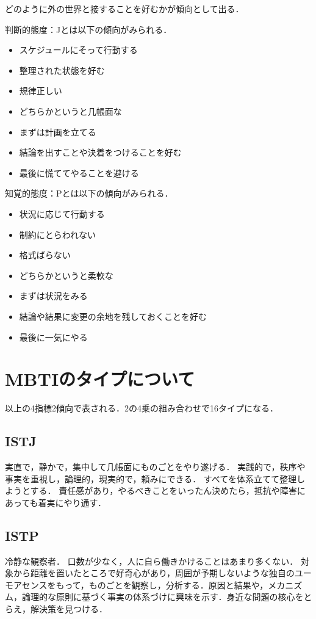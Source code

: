 どのように外の世界と接することを好むかが傾向として出る．

判断的態度：Jとは以下の傾向がみられる．
\begin{itemize}
\item スケジュールにそって行動する
\item 整理された状態を好む
\item 規律正しい
\item どちらかというと几帳面な
\item まずは計画を立てる
\item 結論を出すことや決着をつけることを好む
\item 最後に慌ててやることを避ける
\end{itemize}

知覚的態度：Pとは以下の傾向がみられる．
\begin{itemize}
\item 状況に応じて行動する
\item 制約にとらわれない
\item 格式ばらない
\item どちらかというと柔軟な
\item まずは状況をみる
\item 結論や結果に変更の余地を残しておくことを好む
\item 最後に一気にやる
\end{itemize}
\newpage

\section{MBTIのタイプについて}
以上の4指標2傾向で表される．2の4乗の組み合わせで16タイプになる．
\subsection{ISTJ}
実直で，静かで，集中して几帳面にものごとをやり遂げる．
実践的で，秩序や事実を重視し，論理的，現実的で，頼みにできる．
すべてを体系立てて整理しようとする．
責任感があり，やるべきことをいったん決めたら，抵抗や障害にあっても着実にやり通す．
\subsection{ISTP}
冷静な観察者．
口数が少なく，人に自ら働きかけることはあまり多くない．
対象から距離を置いたところで好奇心があり，周囲が予期しないような独自のユーモアセンスをもって，ものごとを観察し，分析する．原因と結果や，メカニズム，論理的な原則に基づく事実の体系づけに興味を示す．身近な問題の核心をとらえ，解決策を見つける．
